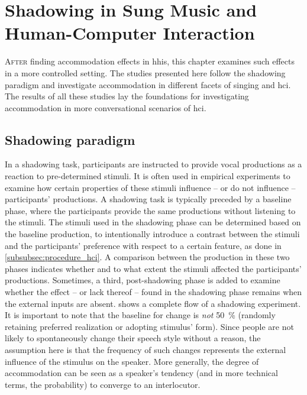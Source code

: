 \chapter{Shadowing in Sung Music and Human-Computer Interaction}
\label{chap:shadowing_in_sung_music_and_human_computer_interaction}

\lettrine{A}{fter} finding accommodation effects in \aclp{hhi}, this chapter examines such effects in a more controlled setting.
The studies presented here follow the shadowing paradigm and investigate accommodation in different facets of singing and \acl{hci}.
The results of all these studies lay the foundations for investigating accommodation in more conversational scenarios of \acl{hci}.

\pagebreak

\acresetall

\section{Shadowing paradigm}
\label{sec:shadowing_paradigm}

In a shadowing task, participants are instructed to provide vocal productions as a reaction to pre-determined stimuli.
It is often used in empirical experiments \citep[e.g.,][]{Goldinger1998echoes} to examine how certain properties of these stimuli influence -- or do not influence -- participants' productions.
A shadowing task is typically preceded by a baseline phase, where the participants provide the same productions without listening to the stimuli.
The stimuli used in the shadowing phase can be determined based on the baseline production, to intentionally introduce a contrast between the stimuli and the participants' preference with respect to a certain feature, as done in \cref{subsubsec:procedure_hci}.
A comparison between the production in these two phases indicates whether and to what extent the stimuli affected the participants' productions.
Sometimes, a third, post-shadowing phase is added to examine whether the effect -- or lack thereof -- found in the shadowing phase remains when the external inputs are absent.
 shows a complete flow of a shadowing experiment.
It is important to note that the baseline for change is \emph{not} \SI{50}{\percent} (randomly retaining preferred realization or adopting stimulus' form).
Since people are not likely to spontaneously change their speech style without a reason, the assumption here is that the frequency of such changes represents the external influence of the stimulus on the speaker.
More generally, the degree of accommodation can be seen as a speaker's tendency (and in more technical terms, the probability) to converge to an interlocutor.

